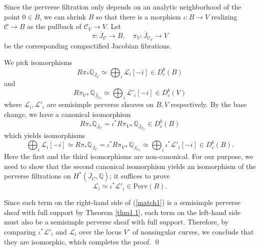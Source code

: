 \documentclass{pspum-l}
\theoremstyle{plain}
\theoremstyle{definition}
\theoremstyle{remark}
\newcommand{\BQ}{{\mathbb{Q}}}
\newcommand{\CC}{{\mathcal C}}
\newcommand{\CL}{{\mathcal L}}
\begin{document}
Since the perverse filtration only depends on an analytic neighborhood of the point $0 \in B$, we can shrink $B$ so that there is a morphism $\iota: B \to V$ realizing $\CC \to B$ as the pullback of $\CC_V \to V$. Let 
\[
\pi: \overline{J}_\CC \to B, \quad \pi_V: \overline{J}_{\CC_V} \to V
\]
be the corresponding compactified Jacobian fibrations.

We pick isomorphisms
\[
R\pi_*\BQ_{\overline{J}_\CC} \simeq \bigoplus_i \CL_i[-i] \in D^b_c(B)
\]
and
\[
R\pi_{V*}\BQ_{\overline{J}_{\CC_V}} \simeq \bigoplus_i \CL'_i[-i] \in D^b_c(V)
\]
where $\CL_i, \CL'_i$ are semisimple perverse sheaves on $B,V$ respectively. By the base change, we have a canonical isomorphism
\[
 R\pi_*\BQ_{\overline{J}_\CC} = \iota^*R\pi_{V*}\BQ_{\overline{J}_{\CC_V}}  \in D^b_c(B)
\]
which yields isomorphisms
\begin{equation}\label{match1}
\bigoplus_{i} \CL_i[-i] \simeq     R\pi_*\BQ_{\overline{J}_\CC} = \iota^*R\pi_{V*}\BQ_{\overline{J}_{\CC_V}} \simeq \bigoplus_i \iota^*\CL'_i[-i] \in D^b_c(B).
\end{equation}
Here the first and the third isomorphisms are non-canonical. For our purpose, we need to show that the second canonical isomorphism yields an isomorphism of the perverse filtrations on $H^*(\overline{J}_C, \BQ)$; it suffices to prove
\[
\CL_i \simeq \iota^*\CL'_i \in \mathrm{Perv}(B).
\]


Since each term on the right-hand side of (\ref{match1}) is a semisimple perverse sheaf with full support by Theorem \ref{thm1.1}, each term on the left-hand side must also be a semisimple perverse sheaf with full support. Therefore, by comparing $\iota^*\CL'_i$ and $\CL_i$ over the locus $V^\circ$ of nonsingular curves, we conclude that they are isomorphic, which completes the proof. \qed
\end{document}
